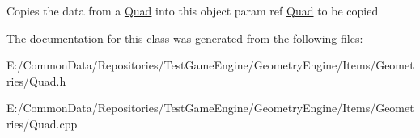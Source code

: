 Copies the data from a \mbox{\hyperlink{class_geometry_engine_1_1_geometry_world_item_1_1_geometry_item_1_1_quad}{Quad}} into this object param ref \mbox{\hyperlink{class_geometry_engine_1_1_geometry_world_item_1_1_geometry_item_1_1_quad}{Quad}} to be copied 

The documentation for this class was generated from the following files\+:\begin{DoxyCompactItemize}
\item 
E\+:/\+Common\+Data/\+Repositories/\+Test\+Game\+Engine/\+Geometry\+Engine/\+Items/\+Geometries/Quad.\+h\item 
E\+:/\+Common\+Data/\+Repositories/\+Test\+Game\+Engine/\+Geometry\+Engine/\+Items/\+Geometries/Quad.\+cpp\end{DoxyCompactItemize}
